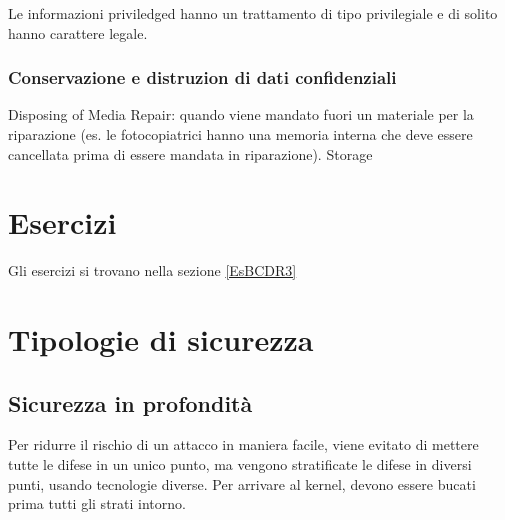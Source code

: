 
Le informazioni priviledged hanno un trattamento di tipo privilegiale e di solito hanno carattere legale.

\subsubsection{Conservazione e distruzion di dati confidenziali}

Disposing of Media
Repair: quando viene mandato fuori un materiale per la riparazione (es. le fotocopiatrici hanno una memoria interna che deve essere cancellata prima di essere mandata in riparazione).
Storage

\section{Esercizi}

Gli esercizi si trovano nella sezione \ref{EsBCDR3}

\section{Tipologie di sicurezza}

\subsection{Sicurezza in profondità}

Per ridurre il rischio di un attacco in maniera facile, viene evitato di 
mettere tutte le difese in un unico punto, ma vengono stratificate le difese in 
diversi punti, usando tecnologie diverse.
Per arrivare al kernel, devono essere bucati prima tutti gli strati intorno.